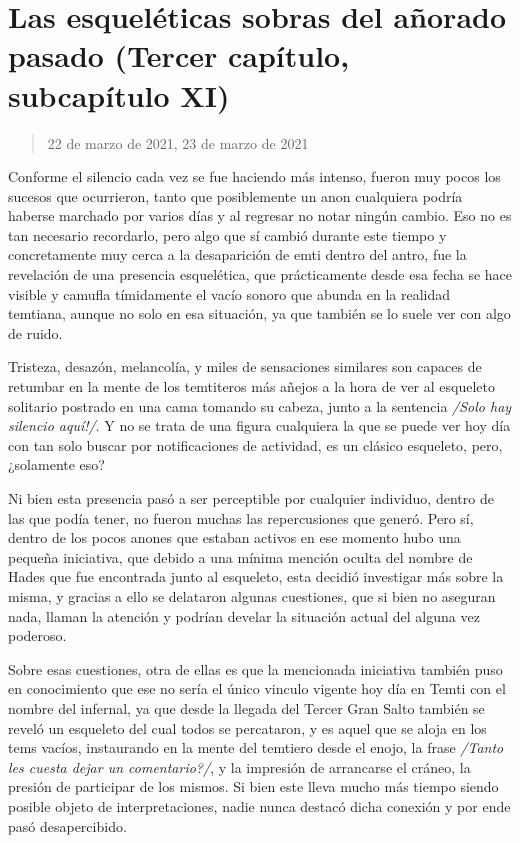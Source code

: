 \documentclass[
  spanish,
]{book}
\begin{document}
\hypertarget{las-esqueluxe9ticas-sobras-del-auxf1orado-pasado-tercer-capuxedtulo-subcapuxedtulo-xi}{%
\section{Las esqueléticas sobras del añorado pasado (Tercer capítulo, subcapítulo XI)}\label{las-esqueluxe9ticas-sobras-del-auxf1orado-pasado-tercer-capuxedtulo-subcapuxedtulo-xi}}

\begin{quote}
22 de marzo de 2021, 23 de marzo de 2021
\end{quote}

Conforme el silencio cada vez se fue haciendo más intenso, fueron muy pocos los sucesos que ocurrieron, tanto que posiblemente un anon cualquiera podría haberse marchado por varios días y al regresar no notar ningún cambio. Eso no es tan necesario recordarlo, pero algo que sí cambió durante este tiempo y concretamente muy cerca a la desaparición de emti dentro del antro, fue la revelación de una presencia esquelética, que prácticamente desde esa fecha se hace visible y camufla tímidamente el vacío sonoro que abunda en la realidad temtiana, aunque no solo en esa situación, ya que también se lo suele ver con algo de ruido.

Tristeza, desazón, melancolía, y miles de sensaciones similares son capaces de retumbar en la mente de los temtiteros más añejos a la hora de ver al esqueleto solitario postrado en una cama tomando su cabeza, junto a la sentencia \emph{/Solo hay silencio aquí!/}. Y no se trata de una figura cualquiera la que se puede ver hoy día con tan solo buscar por notificaciones de actividad, es un clásico esqueleto, pero, ¿solamente eso?

Ni bien esta presencia pasó a ser perceptible por cualquier individuo, dentro de las que podía tener, no fueron muchas las repercusiones que generó. Pero sí, dentro de los pocos anones que estaban activos en ese momento hubo una pequeña iniciativa, que debido a una mínima mención oculta del nombre de Hades que fue encontrada junto al esqueleto, esta decidió investigar más sobre la misma, y gracias a ello se delataron algunas cuestiones, que si bien no aseguran nada, llaman la atención y podrían develar la situación actual del alguna vez poderoso.

Sobre esas cuestiones, otra de ellas es que la mencionada iniciativa también puso en conocimiento que ese no sería el único vinculo vigente hoy día en Temti con el nombre del infernal, ya que desde la llegada del Tercer Gran Salto también se reveló un esqueleto del cual todos se percataron, y es aquel que se aloja en los tems vacíos, instaurando en la mente del temtiero desde el enojo, la frase \emph{/Tanto les cuesta dejar un comentario?/}, y la impresión de arrancarse el cráneo, la presión de participar de los mismos. Si bien este lleva mucho más tiempo siendo posible objeto de interpretaciones, nadie nunca destacó dicha conexión y por ende pasó desapercibido.
\end{document}
